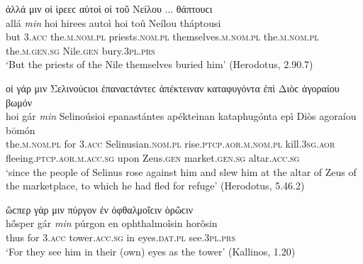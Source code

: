 \begin{exe}
\ex ἀλλά {μιν} οἱ ἱρεεϲ αὐτοὶ οἱ τοῦ Νείλου ... θάπτουϲι\\
\gll allá \emph{min} hoi hirees autoì hoi toû Neílou tháptousi\\
but \textsc{3.acc} the.\textsc{m.nom.pl} priests.\textsc{nom.pl} themselves.\textsc{m.nom.pl} the.\textsc{m.nom.pl} the.\textsc{m.gen.sg} Nile.\textsc{gen} bury.\textsc{3pl.prs}\\
\trans `But the priests of the Nile themselves buried him' (Herodotus, 2.90.7)
\label{HerodotusMin3}
\end{exe}

\begin{exe}
\ex οἱ γάρ {μιν} Σελινούϲιοι ἐπαναϲτάντεϲ ἀπέκτειναν καταφυγόντα ἐπὶ Διὸϲ ἀγοραίου βωμόν\\
\gll hoi gár \emph{min} Selinoúsioi epanastántes apékteinan kataphugónta epì Diòs agoraíou bōmón\\
the.\textsc{m.nom.pl} for \textsc{3.acc} Selinusian.\textsc{nom.pl} rise.\textsc{ptcp.aor.m.nom.pl} kill.\textsc{3sg.aor} fleeing.\textsc{ptcp.aor.m.acc.sg} upon Zeus.\textsc{gen} market.\textsc{gen.sg} altar.\textsc{acc.sg}\\
\trans `since the people of Selinus rose against him and slew him at the altar of Zeus of the marketplace, to which he had fled for refuge' (Herodotus, 5.46.2)
\label{HerodotusMin4}
\end{exe}

\begin{exe}
\ex ὥϲπερ γάρ {μιν} πύργον ἐν ὀφθαλμοῖϲιν ὁρῶϲιν\\
\gll hṓsper gár \emph{min} púrgon en ophthalmoîsin horôsin\\
thus for \textsc{3.acc} tower.\textsc{acc.sg} in eyes.\textsc{dat.pl} see.\textsc{3pl.prs}\\
\trans `For they see him in their (own) eyes as the tower' (Kallinos, 1.20)
\label{KallinosMin}
\end{exe}

